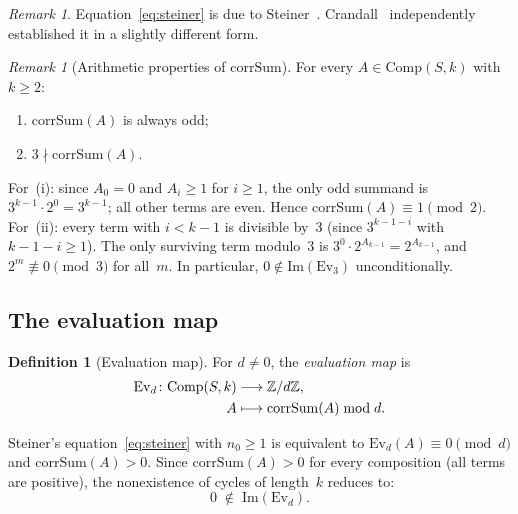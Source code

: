 \documentclass[12pt, a4paper]{amsart}
\theoremstyle{plain}
\theoremstyle{definition}
\newtheorem{definition}[theorem]{Definition}
\theoremstyle{remark}
\newtheorem{remark}[theorem]{Remark}
\newcommand{\Z}{\mathbb{Z}}
\newcommand{\Comp}{\mathrm{Comp}}
\newcommand{\Ev}{\mathrm{Ev}}
\newcommand{\corrSum}{\mathrm{corrSum}}
\begin{document}
\begin{remark}\label{rem:steiner-history}
  Equation~\eqref{eq:steiner} is due to
  Steiner~\cite{Steiner1977}.
  Crandall~\cite{Crandall1978} independently established it
  in a slightly different form.
\end{remark}

\begin{remark}[Arithmetic properties of $\corrSum$]\label{rem:corrsum-arith}
  For every $A \in \Comp(S,k)$ with $k \geq 2$:
  \begin{enumerate}[label=\textup{(\roman*)}]
    \item $\corrSum(A)$ is always odd;
    \item $3 \nmid \corrSum(A)$.
  \end{enumerate}
  For~\textup{(i)}: since $A_0 = 0$ and $A_i \geq 1$ for
  $i \geq 1$, the only odd summand is
  $3^{k-1} \cdot 2^0 = 3^{k-1}$; all other terms are even.
  Hence $\corrSum(A) \equiv 1 \pmod{2}$.
  For~\textup{(ii)}: every term with $i < k-1$ is divisible by~$3$
  (since $3^{k-1-i}$ with $k-1-i \geq 1$).
  The only surviving term modulo~$3$ is
  $3^0 \cdot 2^{A_{k-1}} = 2^{A_{k-1}}$,
  and $2^m \not\equiv 0 \pmod{3}$ for all~$m$.
  In particular, $0 \notin \mathrm{Im}(\Ev_3)$
  unconditionally.
\end{remark}

\subsection{The evaluation map}\label{ssec:eval-map}

\begin{definition}[Evaluation map]\label{def:eval}
  For $d \neq 0$, the \emph{evaluation map} is
  \begin{align}
    \Ev_d \colon \Comp(S,k) &\longrightarrow \Z/d\Z, \\
    A &\longmapsto \corrSum(A) \bmod d. \notag
  \end{align}
\end{definition}

Steiner's equation~\eqref{eq:steiner} with $n_0 \geq 1$
is equivalent to $\Ev_d(A) \equiv 0 \pmod{d}$ and
$\corrSum(A) > 0$.
Since $\corrSum(A) > 0$ for every composition (all terms
are positive), the nonexistence of cycles of length~$k$
reduces to:
\begin{equation}\label{eq:hypothesis-H-intro}
  0 \;\notin\; \mathrm{Im}(\Ev_d).
\end{equation}
\end{document}
